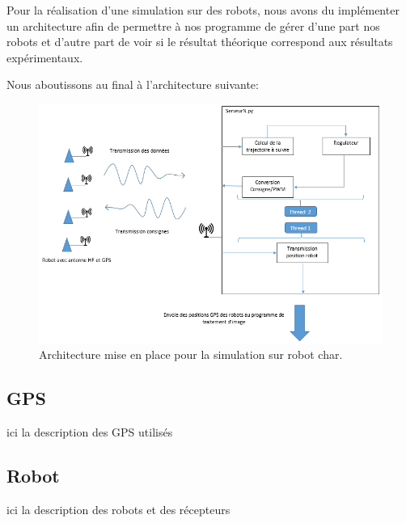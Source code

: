 

Pour la réalisation d'une simulation sur des robots, nous avons du implémenter un architecture afin de permettre à nos programme de gérer d'une part nos robots et d'autre part de voir si le résultat théorique correspond aux résultats expérimentaux.

\medskip

Nous aboutissons au final à l'architecture suivante:

\bigskip

\begin{figure}[ht]
\centering
    \includegraphics[scale=0.8,angle=0]{SyntheseExp.PNG}
    \caption{Architecture mise en place pour la simulation sur robot char.}
    \label{fig:SyntheseExp}
\end{figure}

\bigskip
\subsection{GPS}
ici la description des GPS utilisés
\subsection{Robot}
ici la description des robots et des récepteurs
